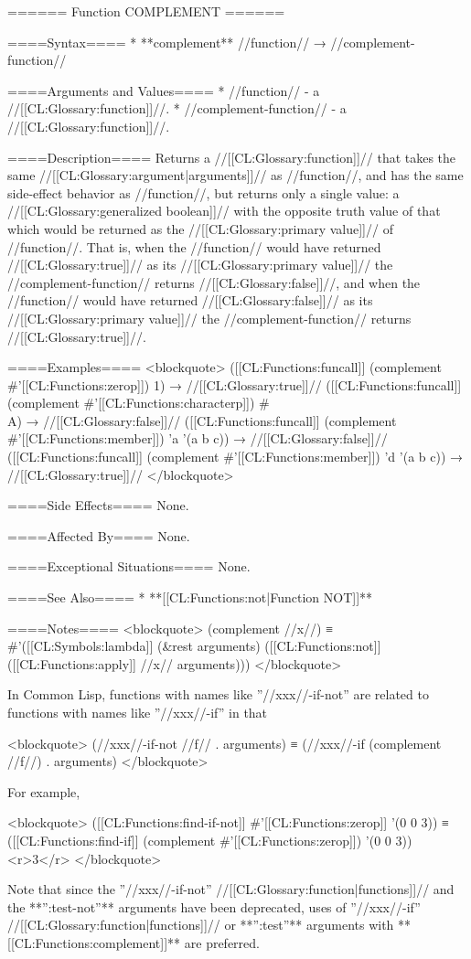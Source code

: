 ====== Function COMPLEMENT ======

====Syntax====
  * **complement** //function// → //complement-function//

====Arguments and Values====
  * //function// - a //[[CL:Glossary:function]]//.
  * //complement-function// - a //[[CL:Glossary:function]]//.

====Description====
Returns a //[[CL:Glossary:function]]// that takes the same //[[CL:Glossary:argument|arguments]]// as //function//, and has the same side-effect behavior as //function//, but returns only a single value: a //[[CL:Glossary:generalized boolean]]// with the opposite truth value of that which would be returned as the //[[CL:Glossary:primary value]]// of //function//. That is, when the //function// would have returned //[[CL:Glossary:true]]// as its //[[CL:Glossary:primary value]]// the //complement-function// returns //[[CL:Glossary:false]]//, and when the //function// would have returned //[[CL:Glossary:false]]// as its //[[CL:Glossary:primary value]]// the //complement-function// returns //[[CL:Glossary:true]]//.

====Examples====
<blockquote>
([[CL:Functions:funcall]] (complement #'[[CL:Functions:zerop]]) 1) → //[[CL:Glossary:true]]//
([[CL:Functions:funcall]] (complement #'[[CL:Functions:characterp]]) #\\A) → //[[CL:Glossary:false]]//
([[CL:Functions:funcall]] (complement #'[[CL:Functions:member]]) 'a '(a b c)) → //[[CL:Glossary:false]]//
([[CL:Functions:funcall]] (complement #'[[CL:Functions:member]]) 'd '(a b c)) → //[[CL:Glossary:true]]//
</blockquote>

====Side Effects====
None.

====Affected By====
None.

====Exceptional Situations====
None.

====See Also====
  * **[[CL:Functions:not|Function NOT]]**

====Notes====
<blockquote>
(complement //x//) ≡ #'([[CL:Symbols:lambda]] (&rest arguments) ([[CL:Functions:not]] ([[CL:Functions:apply]] //x// arguments)))
</blockquote>

In Common Lisp, functions with names like ''//xxx//-if-not'' are related to functions with names like ''//xxx//-if'' in that

<blockquote>
(//xxx//-if-not //f// . arguments) ≡ (//xxx//-if (complement //f//) . arguments)
</blockquote>

For example,

<blockquote>
([[CL:Functions:find-if-not]] #'[[CL:Functions:zerop]] '(0 0 3))
  ≡ ([[CL:Functions:find-if]] (complement #'[[CL:Functions:zerop]]) '(0 0 3)) <r>3</r>
</blockquote>

Note that since the ''//xxx//-if-not'' //[[CL:Glossary:function|functions]]// and the **'':test-not''** arguments have been deprecated, uses of ''//xxx//-if'' //[[CL:Glossary:function|functions]]// or **'':test''** arguments with **[[CL:Functions:complement]]** are preferred.

